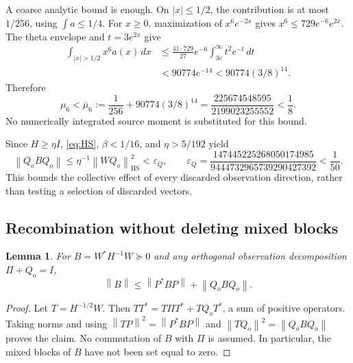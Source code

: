 \documentclass[11pt,a4paper]{article}
\numberwithin{equation}{section}
\newtheorem{lemma}[theorem]{Lemma}
\theoremstyle{definition}\newtheorem{definition}[theorem]{Definition}
\theoremstyle{remark}\newtheorem{remark}[theorem]{Remark}
\newcommand{\norm}[1]{\left\|#1\right\|}
\newcommand{\HS}{\mathrm{HS}}
\newcommand{\epsQ}{\varepsilon_Q}
\begin{document}
A coarse analytic bound is enough. On $|x|\le1/2$, the contribution is at most $1/256$, using $\int a\le1/4$. For $x\ge0$, maximization of $x^6e^{-2x}$ gives $x^6\le729e^{-6}e^{2x}$. The theta envelope and $t=3e^{2x}$ give
\begin{align}
 \int_{|x|>1/2}x^6a(x)\,dx
 &\le\frac{41\cdot729}{27}e^{-6}\int_{3e}^{\infty}t^2e^{-t}\,dt\nonumber\\
 &<90774e^{-14}<90774(3/8)^{14}.
\end{align}
Therefore
\begin{equation}\label{eq:mu6}
 \mu_6<\overline\mu_6:=\frac1{256}+90774(3/8)^{14}
 =\frac{225674548595}{2199023255552}<\frac18.
\end{equation}
No numerically integrated source moment is substituted for this bound.

Since $H\ge\eta I$, \eqref{eq:HS}, $\beta<1/16$, and $\eta>5/192$ yield
\begin{equation}\label{eq:epsilonQ}
 \norm{Q_oBQ_o}\le\eta^{-1}\norm{WQ_o}_{\HS}^2<\epsQ,
 \qquad
 \epsQ=\frac{147445225268050174985}{9444732965739290427392}<\frac1{50}.
\end{equation}
This bounds the collective effect of every discarded observation direction, rather than testing a selection of discarded vectors.

\subsection{Recombination without deleting mixed blocks}
\begin{lemma}\label{lem:recombine}
For $B=W^*H^{-1}W\succeq0$ and any orthogonal observation decomposition $\Pi+Q_o=I$,
\begin{equation}\label{eq:recombine}
 \norm B\le\norm{P^*BP}+\norm{Q_oBQ_o}.
\end{equation}
\end{lemma}
\begin{proof}
Let $T=H^{-1/2}W$. Then $TT^*=T\Pi T^*+TQ_oT^*$, a sum of positive operators. Taking norms and using $\norm{TP}^2=\norm{P^*BP}$ and $\norm{TQ_o}^2=\norm{Q_oBQ_o}$ proves the claim. No commutation of $B$ with $\Pi$ is assumed. In particular, the mixed blocks of $B$ have not been set equal to zero.
\end{proof}
\end{document}
